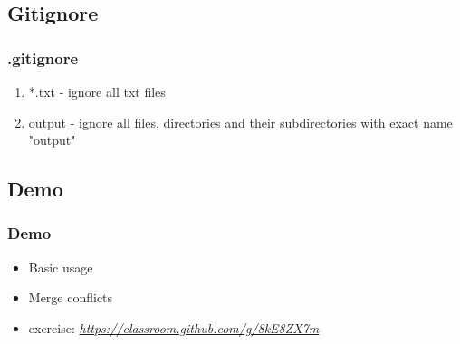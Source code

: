 	\subsection{Gitignore}
    \begin{frame}
		\frametitle{.gitignore}
        \begin{enumerate}
        	\item *.txt - ignore all txt files
        	\item output - ignore all files, directories and their subdirectories with exact name "output"
        \end{enumerate}
	\end{frame}
    
    \subsection{Demo}
    \begin{frame} 
		\frametitle{Demo}
        \begin{itemize}
        	\item Basic usage
            \item Merge conflicts
            \item exercise: 
            \href{https://classroom.github.com/g/8kE8ZX7m}{\textit{https://classroom.github.com/g/8kE8ZX7m}}
        \end{itemize}
	\end{frame}

